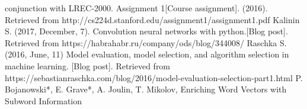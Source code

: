 \begin{thebibliography}
	 conjunction with LREC-2000.
	 {}
	  Assignment 1[Course assignment]. (2016). Retrieved from http://cs224d.stanford.edu/assignment1/assignment1.pdf 
	 {}
		Kalinin S. (2017, December, 7). Convolution neural networks with python.[Blog post]. Retrieved from https://habrahabr.ru/company/ods/blog/344008/
		Raschka S. (2016, June, 11) Model evaluation, model selection, and algorithm selection in machine learning. [Blog post]. Retrieved from
		https://sebastianraschka.com/blog/2016/model-evaluation-selection-part1.html
	 P. Bojanowski*, E. Grave*, A. Joulin, T. Mikolov, Enriching Word Vectors with Subword Information
\end{thebibliography}
